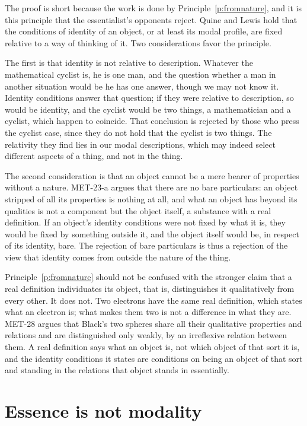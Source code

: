 \documentclass{situationist-preprint}
\begin{document}
The proof is short because the work is done by Principle~\ref{p:fromnature}, and it is this principle that the essentialist's opponents reject. Quine and Lewis hold that the conditions of identity of an object, or at least its modal profile, are fixed relative to a way of thinking of it. Two considerations favor the principle.

The first is that identity is not relative to description. Whatever the mathematical cyclist is, he is one man, and the question whether a man in another situation would be he has one answer, though we may not know it. Identity conditions answer that question; if they were relative to description, so would be identity, and the cyclist would be two things, a mathematician and a cyclist, which happen to coincide. That conclusion is rejected by those who press the cyclist case, since they do not hold that the cyclist is two things. The relativity they find lies in our modal descriptions, which may indeed select different aspects of a thing, and not in the thing.

The second consideration is that an object cannot be a mere bearer of properties without a nature. MET-23-a argues that there are no bare particulars: an object stripped of all its properties is nothing at all, and what an object has beyond its qualities is not a component but the object itself, a substance with a real definition. If an object's identity conditions were not fixed by what it is, they would be fixed by something outside it, and the object itself would be, in respect of its identity, bare. The rejection of bare particulars is thus a rejection of the view that identity comes from outside the nature of the thing.

Principle~\ref{p:fromnature} should not be confused with the stronger claim that a real definition individuates its object, that is, distinguishes it qualitatively from every other. It does not. Two electrons have the same real definition, which states what an electron is; what makes them two is not a difference in what they are. MET-28 argues that Black's two spheres share all their qualitative properties and relations and are distinguished only weakly, by an irreflexive relation between them. A real definition says what an object is, not which object of that sort it is, and the identity conditions it states are conditions on being an object of that sort and standing in the relations that object stands in essentially.

\section{Essence is not modality}\label{s:notmodal}
\end{document}

